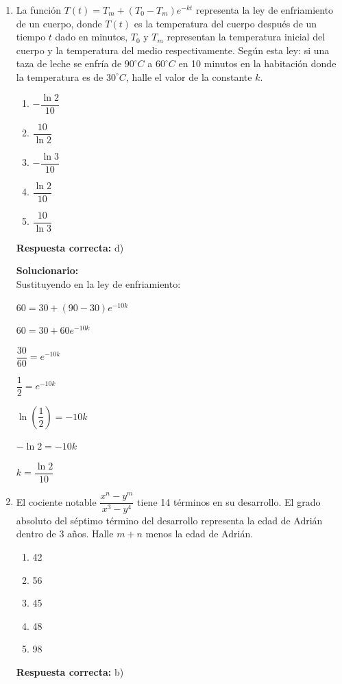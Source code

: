 \begin{enumerate}
	
	\vspace{6mm}
	
	\item La función $T(t)=T_m+(T_0-T_m)e^{-kt}$ representa la ley de enfriamiento de un cuerpo, donde $T(t)$ es la temperatura del cuerpo después de un tiempo $t$ dado en minutos, $T_0$ y $T_m$ representan la temperatura inicial del cuerpo y la temperatura del medio respectivamente. Según esta ley: si una taza de leche se enfría de $90^\circ C$ a $60^\circ C$ en 10 minutos en la habitación donde la temperatura es de $30^\circ C$, halle el valor de la constante $k$.
	\begin{enumerate}[label=\alph*)]
		\item $-\dfrac{\ln 2}{10}$
		\item $\dfrac{10}{\ln 2}$
		\item $-\dfrac{\ln 3}{10}$
		\item $\dfrac{\ln 2}{10}$
		\item $\dfrac{10}{\ln 3}$
	\end{enumerate}
	\textbf{Respuesta correcta:} d)
	
	\vspace{2mm}
	\textbf{Solucionario:}\\
	Sustituyendo en la ley de enfriamiento:
	
	$60=30+(90-30)e^{-10k}$
	
	$60=30+60e^{-10k}$
	
	$\dfrac{30}{60}=e^{-10k}$
	
	$\dfrac{1}{2}=e^{-10k}$
	
	
	$\ln\left(\dfrac{1}{2}\right)=-10k$
	
	$-\ln 2=-10k$
	
	$k=\dfrac{\ln 2}{10}$
	
	
	\vspace{6mm}
	
	\item El cociente notable $\dfrac{x^n-y^m}{x^3-y^4}$ tiene 14 términos en su desarrollo. El grado absoluto del séptimo término del desarrollo representa la edad de Adrián dentro de 3 años. Halle $m+n$ menos la edad de Adrián.
	\begin{enumerate}[label=\alph*)]
		\item 42
		\item 56
		\item 45
		\item 48
		\item 98
	\end{enumerate}
	\textbf{Respuesta correcta:} b)
	

\end{enumerate}
